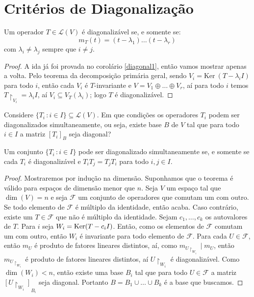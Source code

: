 \documentclass[11pt,twoside,a4paper]{book}
\begin{document}
\section{Critérios de Diagonalização}

\begin{teorema}\label{diagonal2}
Um operador \(T\in\mathcal{L}(V)\) é diagonalizável se, e somente se:
\[
m_T(t)=(t-\lambda_1)\ldots(t-\lambda_r)
\]
com \(\lambda_i\not=\lambda_j\) sempre que \(i\not= j\).
\end{teorema}
\begin{proof}
A ida já foi provada no corolário \ref{diagonal1}, então
vamos mostrar apenas a volta. Pelo teorema da decomposição primária geral, sendo $V_i=\mathrm{Ker} \ (T-\lambda_iI)$ para todo $i$, então cada $V_i$ é $T$-invariante e \(V=V_1\oplus\ldots\oplus V_r\), aí para todo $i$ temos \(T\upharpoonright_{V_i}=\lambda_iI\), aí \(V_i\subseteq V_T(\lambda_i)\); logo $T$ é diagonalizável. 
\end{proof}

\noindent
Considere \(\{T_i\,\colon i\in I\}\subseteq\mathcal{L}(V)\). Em que condições os operadores \(T_i\) podem ser diagonalizados simultaneamente, ou seja, existe base $B$ de $V$ tal que para todo $i\in I$ a matriz $[T_i]_B$ seja diagonal?

\begin{teorema}
Um conjunto \(\{T_i\,\colon i \in I\}\) pode ser diagonalizado
simultaneamente se, e somente se cada \(T_i\) é diagonalizável e \(T_iT_j=T_jT_i\) para todo \(i,j\in I\).\end{teorema}
\begin{proof}
Mostraremos por indução na dimensão. Suponhamos que o teorema é válido para espaços de dimensão menor que $n$. Seja $V$ um espaço tal que $\dim(V)=n$ e seja $\mathcal{F}$ um conjunto de operadores que comutam um com outro. Se todo elemento de $\mathcal{F}$ é múltiplo da identidade, então acaba. Caso contrário, existe um $T\in\mathcal{F}$ que não é múltiplo da identidade. Sejam $c_1,\dots,c_k$ os autovalores de $T$. Para $i$ seja $W_i=\operatorname{Ker}(T-c_iI)$. Então, como os elementos de $\mathcal{F}$ comutam um com outro, então $W_i$ é invariante para todo elemento de $\mathcal{F}$. Para cada $U\in\mathcal{F}$, então $m_U$ é produto de fatores lineares distintos, aí, como $m_{U\upharpoonright_{W_i}}\mid m_U$, então $m_{U\upharpoonright_{W_i}}$ é produto de fatores lineares distintos, aí $U\upharpoonright_{W_i}$ é diagonalizável. Como $\dim(W_i)<n$, então existe uma base $B_i$ tal que para todo $U\in\mathcal{F}$ a matriz $[U\upharpoonright_{W_i}]_{B_i}$ seja diagonal. Portanto $B=B_1\cup\dots\cup B_k$ é a base que buscamos.
\end{proof}
\end{document}
